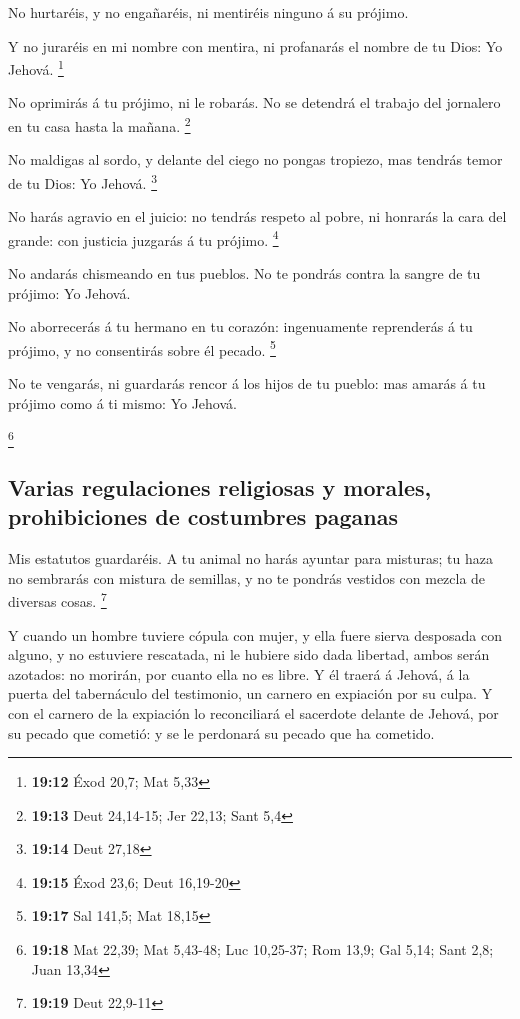  No hurtaréis, y no engañaréis, ni mentiréis ninguno á su
prójimo.

 Y no juraréis en mi nombre con mentira, ni profanarás el
nombre de tu Dios: Yo Jehová. \footnote{\textbf{19:12} Éxod 20,7; Mat
  5,33}

 No oprimirás á tu prójimo, ni le robarás. No se detendrá
el trabajo del jornalero en tu casa hasta la mañana. \footnote{\textbf{19:13}
  Deut 24,14-15; Jer 22,13; Sant 5,4}

 No maldigas al sordo, y delante del ciego no pongas
tropiezo, mas tendrás temor de tu Dios: Yo Jehová. \footnote{\textbf{19:14}
  Deut 27,18}

 No harás agravio en el juicio: no tendrás respeto al
pobre, ni honrarás la cara del grande: con justicia juzgarás á tu
prójimo. \footnote{\textbf{19:15} Éxod 23,6; Deut 16,19-20}

 No andarás chismeando en tus pueblos. No te pondrás contra
la sangre de tu prójimo: Yo Jehová.

 No aborrecerás á tu hermano en tu corazón: ingenuamente
reprenderás á tu prójimo, y no consentirás sobre él pecado. \footnote{\textbf{19:17}
  Sal 141,5; Mat 18,15}

 No te vengarás, ni guardarás rencor á los hijos de tu
pueblo: mas amarás á tu prójimo como á ti mismo: Yo Jehová.

\footnote{\textbf{19:18} Mat 22,39; Mat 5,43-48; Luc 10,25-37; Rom 13,9;
  Gal 5,14; Sant 2,8; Juan 13,34}

\hypertarget{varias-regulaciones-religiosas-y-morales-prohibiciones-de-costumbres-paganas}{%
\subsection{Varias regulaciones religiosas y morales, prohibiciones de
costumbres
paganas}\label{varias-regulaciones-religiosas-y-morales-prohibiciones-de-costumbres-paganas}}

 Mis estatutos guardaréis. A tu animal no harás ayuntar
para misturas; tu haza no sembrarás con mistura de semillas, y no te
pondrás vestidos con mezcla de diversas cosas. \footnote{\textbf{19:19}
  Deut 22,9-11}

 Y cuando un hombre tuviere cópula con mujer, y ella fuere
sierva desposada con alguno, y no estuviere rescatada, ni le hubiere
sido dada libertad, ambos serán azotados: no morirán, por cuanto ella no
es libre.  Y él traerá á Jehová, á la puerta del
tabernáculo del testimonio, un carnero en expiación por su culpa.
 Y con el carnero de la expiación lo reconciliará el
sacerdote delante de Jehová, por su pecado que cometió: y se le
perdonará su pecado que ha cometido.

